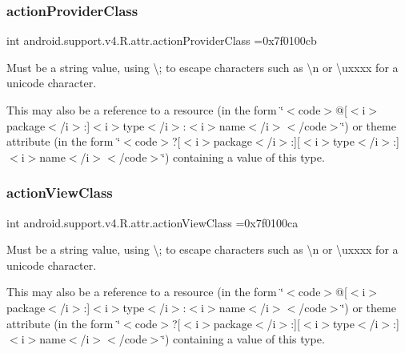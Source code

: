 \subsubsection{\texorpdfstring{action\+Provider\+Class}{actionProviderClass}}
{\footnotesize\ttfamily int android.\+support.\+v4.\+R.\+attr.\+action\+Provider\+Class =0x7f0100cb\hspace{0.3cm}{\ttfamily [static]}}

Must be a string value, using \textquotesingle{}\textbackslash{};\textquotesingle{} to escape characters such as \textquotesingle{}\textbackslash{}n\textquotesingle{} or \textquotesingle{}\textbackslash{}uxxxx\textquotesingle{} for a unicode character. 

This may also be a reference to a resource (in the form \char`\"{}$<$code$>$@\mbox{[}$<$i$>$package$<$/i$>$\+:\mbox{]}$<$i$>$type$<$/i$>$\+:$<$i$>$name$<$/i$>$$<$/code$>$\char`\"{}) or theme attribute (in the form \char`\"{}$<$code$>$?\mbox{[}$<$i$>$package$<$/i$>$\+:\mbox{]}\mbox{[}$<$i$>$type$<$/i$>$\+:\mbox{]}$<$i$>$name$<$/i$>$$<$/code$>$\char`\"{}) containing a value of this type. \mbox{\label{classandroid_1_1support_1_1v4_1_1R_1_1attr_a9db9f5e44ffd00051c6d74e396af5a02}} 
\subsubsection{\texorpdfstring{action\+View\+Class}{actionViewClass}}
{\footnotesize\ttfamily int android.\+support.\+v4.\+R.\+attr.\+action\+View\+Class =0x7f0100ca\hspace{0.3cm}{\ttfamily [static]}}

Must be a string value, using \textquotesingle{}\textbackslash{};\textquotesingle{} to escape characters such as \textquotesingle{}\textbackslash{}n\textquotesingle{} or \textquotesingle{}\textbackslash{}uxxxx\textquotesingle{} for a unicode character. 

This may also be a reference to a resource (in the form \char`\"{}$<$code$>$@\mbox{[}$<$i$>$package$<$/i$>$\+:\mbox{]}$<$i$>$type$<$/i$>$\+:$<$i$>$name$<$/i$>$$<$/code$>$\char`\"{}) or theme attribute (in the form \char`\"{}$<$code$>$?\mbox{[}$<$i$>$package$<$/i$>$\+:\mbox{]}\mbox{[}$<$i$>$type$<$/i$>$\+:\mbox{]}$<$i$>$name$<$/i$>$$<$/code$>$\char`\"{}) containing a value of this type. \mbox{\label{classandroid_1_1support_1_1v4_1_1R_1_1attr_a7b486bbf67b2e1692b9e51eafcbe82d1}} 
